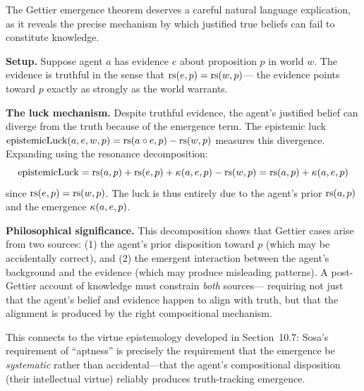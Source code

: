 \begin{remark}
The Gettier emergence theorem deserves a careful natural language explication,
as it reveals the precise mechanism by which justified true beliefs can fail
to constitute knowledge.

\textbf{Setup.} Suppose agent $a$ has evidence $e$ about proposition $p$ in
world $w$. The evidence is truthful in the sense that $\mathrm{rs}(e, p) = \mathrm{rs}(w, p)$---
the evidence points toward $p$ exactly as strongly as the world warrants.

\textbf{The luck mechanism.} Despite truthful evidence, the agent's justified
belief can diverge from the truth because of the emergence term. The epistemic
luck $\mathrm{epistemicLuck}(a, e, w, p) = \mathrm{rs}(a \circ e, p) - \mathrm{rs}(w, p)$
measures this divergence. Expanding using the resonance decomposition:
\[
  \mathrm{epistemicLuck} = \mathrm{rs}(a, p) + \mathrm{rs}(e, p) + \kappa(a, e, p) - \mathrm{rs}(w, p)
  = \mathrm{rs}(a, p) + \kappa(a, e, p)
\]
since $\mathrm{rs}(e, p) = \mathrm{rs}(w, p)$. The luck is thus entirely due to the agent's
prior $\mathrm{rs}(a, p)$ and the emergence $\kappa(a, e, p)$.

\textbf{Philosophical significance.} This decomposition shows that Gettier
cases arise from two sources: (1) the agent's prior disposition toward $p$
(which may be accidentally correct), and (2) the emergent interaction between
the agent's background and the evidence (which may produce misleading patterns).
A post-Gettier account of knowledge must constrain \emph{both} sources---
requiring not just that the agent's belief and evidence happen to align with truth,
but that the alignment is produced by the right compositional mechanism.

This connects to the virtue epistemology developed in Section~10.7: Sosa's
requirement of ``aptness'' is precisely the requirement that the emergence be
\emph{systematic} rather than accidental---that the agent's compositional
disposition (their intellectual virtue) reliably produces truth-tracking emergence.
\end{remark}

